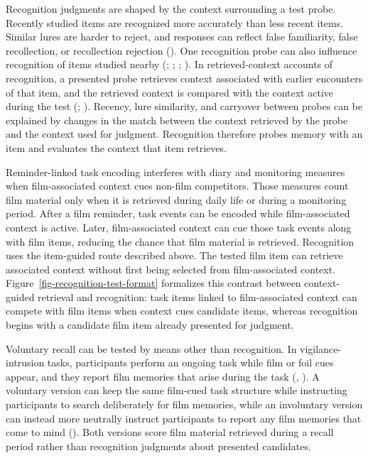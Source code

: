 \documentclass[
  man,
  floatsintext,
  longtable,
  nolmodern,
  notxfonts,
  notimes,
  draftfirst,
  colorlinks=true,linkcolor=blue,citecolor=blue,urlcolor=blue]{apa7}
\begin{document}
Recognition judgments are shaped by the context surrounding a test
probe. Recently studied items are recognized more accurately than less
recent items. Similar lures are harder to reject, and responses can
reflect false familiarity, false recollection, or recollection rejection
(). One recognition
probe can also influence recognition of items studied nearby
(;
;
;
). In
retrieved-context accounts of recognition, a presented probe retrieves
context associated with earlier encounters of that item, and the
retrieved context is compared with the context active during the test
(;
). Recency, lure
similarity, and carryover between probes can be explained by changes in
the match between the context retrieved by the probe and the context
used for judgment. Recognition therefore probes memory with an item and
evaluates the context that item retrieves.

Reminder-linked task encoding interferes with diary and monitoring
measures when film-associated context cues non-film competitors. Those
measures count film material only when it is retrieved during daily life
or during a monitoring period. After a film reminder, task events can be
encoded while film-associated context is active. Later, film-associated
context can cue those task events along with film items, reducing the
chance that film material is retrieved. Recognition uses the item-guided
route described above. The tested film item can retrieve associated
context without first being selected from film-associated context.
Figure~\ref{fig-recognition-test-format} formalizes this contrast
between context-guided retrieval and recognition: task items linked to
film-associated context can compete with film items when context cues
candidate items, whereas recognition begins with a candidate film item
already presented for judgment.

Voluntary recall can be tested by means other than recognition. In
vigilance-intrusion tasks, participants perform an ongoing task while
film or foil cues appear, and they report film memories that arise
during the task (,
). A voluntary version can keep
the same film-cued task structure while instructing participants to
search deliberately for film memories, while an involuntary version can
instead more neutrally instruct participants to report any film memories
that come to mind (). Both versions score film material retrieved during a recall
period rather than recognition judgments about presented candidates.
\end{document}
